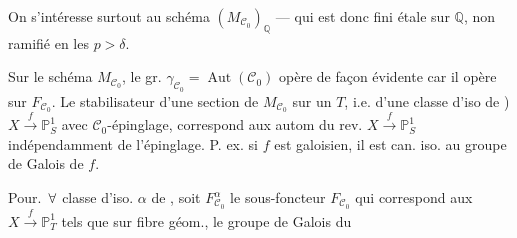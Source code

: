 On s'intéresse surtout au schéma $(M_{\mathcal C_0})_{\mathbb Q}$ --- qui est donc fini étale sur $\mathbb Q$, non ramifié en les $p>\delta$.


Sur le schéma $M_{\mathcal C_0}$, le gr. $\gamma_{\mathcal C_0}=\operatorname{Aut}(\mathcal C_0)$ opère de façon évidente car il opère sur $F_{\mathcal C_0}$. Le stabilisateur d'une section de $M_{\mathcal C_0}$ sur un $T$, i.e. d'une classe d'iso de ) $X\xrightarrow{f}\mathbb P^1_S$ \unsure{\ldots} avec \deleted{$\unsure{\gamma}$} $\mathcal C_0$-épinglage, correspond  aux autom du  rev. $X\xrightarrow{f}\mathbb P^1_S$ indépendamment de l'épinglage. P. ex. si $f$ est galoisien, il est can. iso. au groupe de Galois de $f$.

Pour.\ $\forall$ classe d'iso. $\alpha$ de   ,   soit $F_{\mathcal C_0}^{\alpha}$ le sous-foncteur  $F_{\mathcal C_0}$ qui correspond aux $X\xrightarrow{f}\mathbb P^1_T$ tels que sur  fibre géom., le groupe de Galois du
